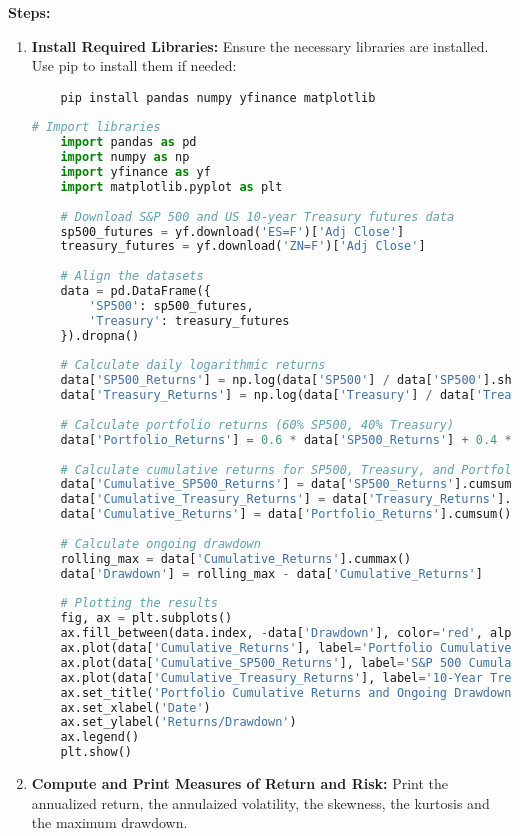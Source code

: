 \documentclass{article}
\begin{document}
\textbf{Steps:}
\begin{enumerate}
    \item \textbf{Install Required Libraries:} Ensure the necessary libraries are installed. Use pip to install them if needed:
    \begin{verbatim}
    pip install pandas numpy yfinance matplotlib
    \end{verbatim}

    \begin{lstlisting}[language=Python]
    # Import libraries
    import pandas as pd
    import numpy as np
    import yfinance as yf
    import matplotlib.pyplot as plt
    
    # Download S&P 500 and US 10-year Treasury futures data
    sp500_futures = yf.download('ES=F')['Adj Close']
    treasury_futures = yf.download('ZN=F')['Adj Close']
    
    # Align the datasets
    data = pd.DataFrame({
        'SP500': sp500_futures,
        'Treasury': treasury_futures
    }).dropna()
    
    # Calculate daily logarithmic returns
    data['SP500_Returns'] = np.log(data['SP500'] / data['SP500'].shift(1))
    data['Treasury_Returns'] = np.log(data['Treasury'] / data['Treasury'].shift(1))
    
    # Calculate portfolio returns (60% SP500, 40% Treasury)
    data['Portfolio_Returns'] = 0.6 * data['SP500_Returns'] + 0.4 * data['Treasury_Returns']
    
    # Calculate cumulative returns for SP500, Treasury, and Portfolio
    data['Cumulative_SP500_Returns'] = data['SP500_Returns'].cumsum()
    data['Cumulative_Treasury_Returns'] = data['Treasury_Returns'].cumsum()
    data['Cumulative_Returns'] = data['Portfolio_Returns'].cumsum()
    
    # Calculate ongoing drawdown
    rolling_max = data['Cumulative_Returns'].cummax()
    data['Drawdown'] = rolling_max - data['Cumulative_Returns']
    
    # Plotting the results
    fig, ax = plt.subplots()
    ax.fill_between(data.index, -data['Drawdown'], color='red', alpha=0.3)
    ax.plot(data['Cumulative_Returns'], label='Portfolio Cumulative Returns')
    ax.plot(data['Cumulative_SP500_Returns'], label='S&P 500 Cumulative Returns', linestyle='--', linewidth=0.5)
    ax.plot(data['Cumulative_Treasury_Returns'], label='10-Year Treasury Cumulative Returns', linestyle='--', linewidth=0.5)
    ax.set_title('Portfolio Cumulative Returns and Ongoing Drawdown')
    ax.set_xlabel('Date')
    ax.set_ylabel('Returns/Drawdown')
    ax.legend()
    plt.show()
    \end{lstlisting}

    \item \textbf{Compute and Print Measures of Return and Risk:}
    Print the annualized return, the annulaized volatility, the skewness, the kurtosis and the maximum drawdown.
    
\end{enumerate}
\end{document}
